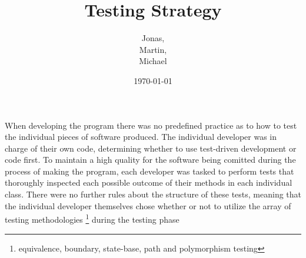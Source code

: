 \documentclass[12pt,a4paper] {report}
\author{Jonas,\\Martin,\\Michael}
\title{Testing Strategy}
\date{\today}
\begin{document}
	\long{}
	\maketitle
	
	
	When developing the program there was no predefined practice as to how to test the individual pieces of software produced. The individual developer was in charge of their own code, determining whether to use test-driven development or code first.
	To maintain a high quality for the software being comitted during the process of making the program, each developer was tasked to perform tests that thoroughly inspected each possible outcome of their methods in each individual class.
	There were no further rules about the structure of these tests, meaning that the individual developer themselves chose whether or not to utilize the array of testing methodologies \footnote{equivalence, boundary, state-base, path and polymorphism testing} during the testing phase
		
	
	
	
\end{document}
